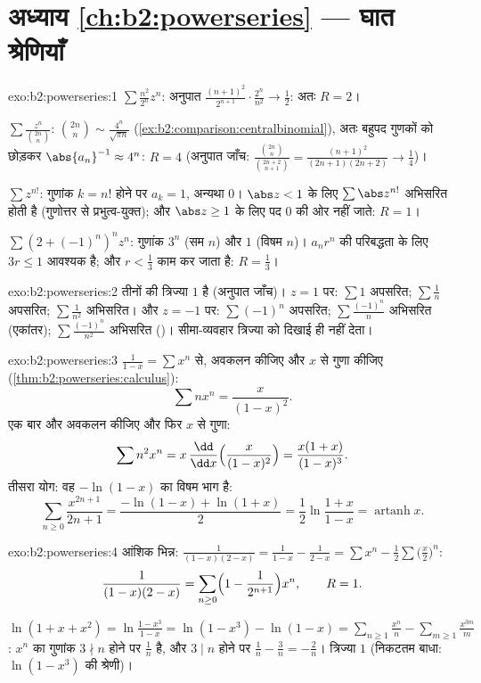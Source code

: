 \section*{अध्याय \ref{ch:b2:powerseries} --- घात श्रेणियाँ}

\begin{solution}{exo:b2:powerseries:1}
$\sum \frac{n^2}{2^n}z^n$: अनुपात $\frac{(n+1)^2}{2^{n+1}}\cdot
\frac{2^n}{n^2} \to \frac12$: अतः $R = 2$।

$\sum \frac{z^n}{\binom{2n}{n}}$: $\binom{2n}{n} \sim
\frac{4^n}{\sqrt{\pi n}}$ (\cref{ex:b2:comparison:centralbinomial}), अतः बहुपद गुणकों को छोड़कर $\abs{a_n}^{-1} \approx 4^n$: $R = 4$ (अनुपात जाँच: $\frac{\binom{2n}{n}}{\binom{2n+2}{n+1}} =
\frac{(n+1)^2}{(2n+1)(2n+2)} \to \frac14$)।

$\sum z^{n!}$: गुणांक $k = n!$ होने पर $a_k = 1$, अन्यथा $0$। $\abs z < 1$ के लिए $\sum \abs z^{n!}$ अभिसरित होती है
(गुणोत्तर से प्रभुत्व-युक्त); और $\abs z \geq 1$ के लिए पद $0$ की ओर नहीं जाते: $R = 1$।

$\sum (2 + (-1)^n)^n z^n$: गुणांक $3^n$ (सम $n$) और $1$ (विषम $n$)। $a_nr^n$ की परिबद्धता के लिए $3r \leq 1$
आवश्यक है; और $r <
\frac13$ काम कर जाता है: $R = \frac13$।
\end{solution}

\begin{solution}{exo:b2:powerseries:2}
तीनों की त्रिज्या $1$ है (अनुपात जाँच)। $z = 1$ पर: $\sum 1$ अपसरित; $\sum\frac1n$ अपसरित;
$\sum\frac{1}{n^2}$ अभिसरित। और $z = -1$ पर: $\sum(-1)^n$ अपसरित; $\sum\frac{(-1)^n}{n}$ अभिसरित (एकांतर); $\sum\frac{(-1)^n}{n^2}$ अभिसरित
()। सीमा-व्यवहार त्रिज्या को दिखाई ही नहीं देता।
\end{solution}

\begin{solution}{exo:b2:powerseries:3}
$\frac{1}{1-x} = \sum x^n$ से, अवकलन कीजिए और $x$ से गुणा कीजिए (\cref{thm:b2:powerseries:calculus}):
\[
\sum n x^n = \frac{x}{(1-x)^2} .
\]
एक बार और अवकलन कीजिए और फिर $x$ से गुणा:
\[
\sum n^2 x^n = x\,\frac{\dd}{\dd x}\Bigl(\frac{x}{(1-x)^2}\Bigr)
= \frac{x(1 + x)}{(1-x)^3} .
\]
तीसरा योग: वह $-\ln(1 - x)$ का विषम भाग है:
\[
\sum_{n\geq0} \frac{x^{2n+1}}{2n+1}
= \frac{-\ln(1-x) + \ln(1+x)}{2}
= \frac12 \ln\frac{1+x}{1-x}
= \operatorname{artanh} x .
\]
\end{solution}

\begin{solution}{exo:b2:powerseries:4}
आंशिक भिन्न: $\frac{1}{(1-x)(2-x)} = \frac{1}{1-x} -
\frac{1}{2 - x} = \sum x^n - \frac12\sum \bigl(\frac x2\bigr)^n$:
\[
\frac{1}{(1-x)(2-x)} = \sum_{n\geq0} \Bigl(1 -
\frac{1}{2^{n+1}}\Bigr)x^n,
\qquad R = 1 .
\]

$\ln(1 + x + x^2) = \ln\frac{1 - x^3}{1 - x} = \ln(1 - x^3) -
\ln(1 - x) = \sum_{n\geq1}\frac{x^n}{n} -
\sum_{m\geq1}\frac{x^{3m}}{m}$: $x^n$ का गुणांक $3 \nmid n$ होने पर $\frac1n$ है, और $3 \mid n$ होने पर $\frac1n - \frac{3}{n} = -\frac2n$। त्रिज्या $1$
(निकटतम बाधा: $\ln(1-x^3)$ की श्रेणी)।
\end{solution}

